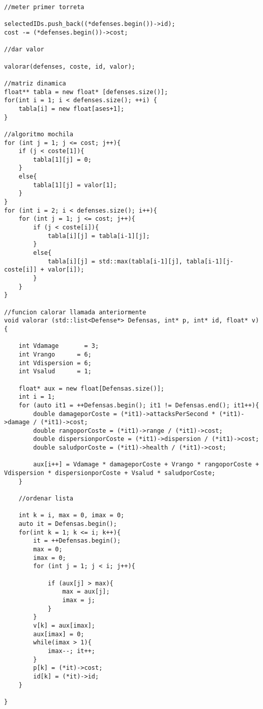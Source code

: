 \begin{lstlisting}
//meter primer torreta

selectedIDs.push_back((*defenses.begin())->id);
cost -= (*defenses.begin())->cost;

//dar valor

valorar(defenses, coste, id, valor);

//matriz dinamica
float** tabla = new float* [defenses.size()]; 
for(int i = 1; i < defenses.size(); ++i) {
    tabla[i] = new float[ases+1];
}

//algoritmo mochila
for (int j = 1; j <= cost; j++){
    if (j < coste[1]){
        tabla[1][j] = 0;
    }
    else{
        tabla[1][j] = valor[1];
    }
}
for (int i = 2; i < defenses.size(); i++){
    for (int j = 1; j <= cost; j++){
        if (j < coste[i]){
            tabla[i][j] = tabla[i-1][j];
        }
        else{
            tabla[i][j] = std::max(tabla[i-1][j], tabla[i-1][j-coste[i]] + valor[i]);
        }
    }
}

//funcion calorar llamada anteriormente
void valorar (std::list<Defense*> Defensas, int* p, int* id, float* v){
    
    int Vdamage       = 3;
    int Vrango      = 6;
    int Vdispersion = 6;
    int Vsalud      = 1;

    float* aux = new float[Defensas.size()];
    int i = 1;
    for (auto it1 = ++Defensas.begin(); it1 != Defensas.end(); it1++){
        double damageporCoste = (*it1)->attacksPerSecond * (*it1)->damage / (*it1)->cost;
        double rangoporCoste = (*it1)->range / (*it1)->cost;
        double dispersionporCoste = (*it1)->dispersion / (*it1)->cost;
        double saludporCoste = (*it1)->health / (*it1)->cost;

        aux[i++] = Vdamage * damageporCoste + Vrango * rangoporCoste + Vdispersion * dispersionporCoste + Vsalud * saludporCoste;
    }

    //ordenar lista

    int k = i, max = 0, imax = 0;
    auto it = Defensas.begin();
    for(int k = 1; k <= i; k++){
        it = ++Defensas.begin();
        max = 0;
        imax = 0;
        for (int j = 1; j < i; j++){
            
            if (aux[j] > max){
                max = aux[j];
                imax = j;
            }
        }
        v[k] = aux[imax];
        aux[imax] = 0;
        while(imax > 1){
            imax--; it++;
        }
        p[k] = (*it)->cost;
        id[k] = (*it)->id;
    }

}

\end{lstlisting}